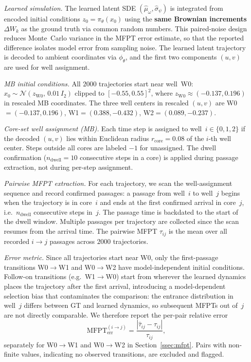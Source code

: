 \documentclass[11pt]{article}
\begin{document}
\emph{Learned simulation.}
The learned latent SDE $(\hat\mu_\omega,\hat\sigma_\psi)$ is
integrated from encoded initial conditions
$z_0 = \pi_\theta(x_0)$ using the \textbf{same Brownian
increments} $\Delta W_k$ as the ground truth via common random
numbers.
This paired-noise design reduces Monte~Carlo variance in the
MFPT error estimate, so that the reported difference isolates
model error from sampling noise.
The learned latent trajectory is decoded to ambient coordinates
via $\phi_\theta$, and the first two components $(u,v)$ are
used for well assignment.

\emph{MB initial conditions.}
All $2000$ trajectories start near well~W0:
$x_0 \sim \mathcal{N}(z_{\mathrm{W0}},\, 0.01\,I_2)$
clipped to $[-0.55,0.55]^2$, where
$z_{\mathrm{W0}} \approx (-0.137, 0.196)$ in rescaled
MB coordinates.
The three well centers in rescaled $(u,v)$ are
W0${}=(-0.137, 0.196)$,
W1${}=(0.388, -0.432)$,
W2${}=(0.089, -0.237)$.

\emph{Core-set well assignment (MB).}
Each time step is assigned to well~$i\in\{0,1,2\}$ if the decoded
$(u,v)$ lies within Euclidean radius $r_{\mathrm{core}}=0.08$ of the
$i$-th well center.
Steps outside all cores are labeled $-1$ for unassigned.
The dwell confirmation ($n_{\mathrm{dwell}}=10$ consecutive
steps in a core) is applied during passage extraction, not
during per-step assignment.

\emph{Pairwise MFPT extraction.}
For each trajectory, we scan the well-assignment sequence and
record confirmed passages: a passage from well~$i$ to well~$j$
begins when the trajectory is in core~$i$ and ends at the first
confirmed arrival in core~$j$, i.e.\ $n_{\mathrm{dwell}}$
consecutive steps in~$j$.
The passage time is backdated to the start of the dwell window.
Multiple passages per trajectory are collected since the scan resumes
from the arrival time.
The pairwise MFPT $\tau_{ij}$ is the mean over all
recorded $i\to j$ passages across $2000$ trajectories.

\emph{Error metric.}
Since all trajectories start near W0, only the first-passage
transitions W0${\to}$W1 and W0${\to}$W2 have model-independent
initial conditions.
Follow-on transitions (e.g.\ W1${\to}$W0) start from wherever the
learned dynamics places the trajectory after the first arrival,
introducing a model-dependent selection bias that contaminates
the comparison: the entrance distribution in well~$j$ differs
between GT and learned dynamics, so subsequent MFPTs out of~$j$
are not directly comparable.
We therefore report the per-pair relative error
\[
  \mathrm{MFPT}_{\mathrm{err}}^{(i\to j)}
  = \frac{|\hat\tau_{ij} - \tau_{ij}|}{\tau_{ij}},
\]
separately for W0${\to}$W1 and W0${\to}$W2 in Section~\ref{ssec:mfpt}.
Pairs with non-finite values, indicating no observed transitions, are
excluded and flagged.
\end{document}
